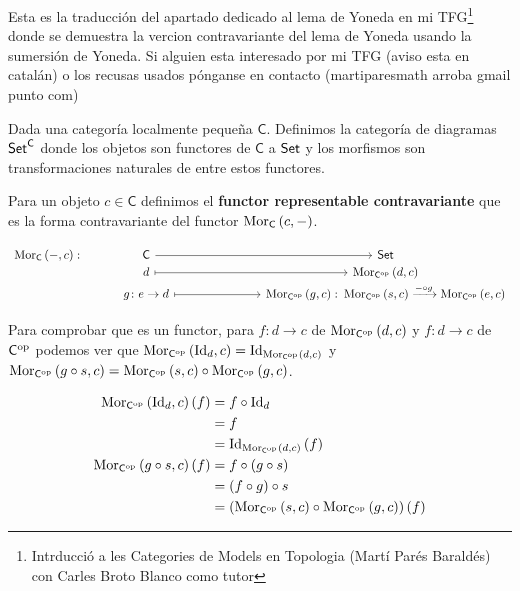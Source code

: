 Esta es la traducción del apartado dedicado al lema de Yoneda en mi TFG\footnote{Intrducció a les Categories de Models en Topologia (Martí Parés Baraldés) con Carles Broto Blanco como tutor} donde se demuestra la vercion contravariante del lema de Yoneda usando la sumersión de Yoneda. Si alguien esta interesado por mi TFG (aviso esta en catalán) o los recusas usados pónganse en contacto (martiparesmath arroba gmail punto com)

\begin{definition}\label{def:diagCat}
  Dada una categoría localmente pequeña $\mathsf{C}$. Definimos la categoría de diagramas $\textup{\textsf{Set}}^{\mathsf{C}}$ donde los objetos son functores de $\mathsf{C}$ a $\textup{\textsf{Set}}$ y los morfismos son transformaciones naturales de entre estos functores.
\end{definition}


\begin{definition}\label{def:Mor(-,c)}
  Para un objeto $c \in \mathsf{C}$ definimos el {\bf functor representable contravariante} que es la forma contravariante del functor $\operatorname{\mathrm{Mor}}_{\mathsf{C}}\left(c,-\right)$.

  \begin{equation*}
    \begin{tikzcd}[row sep = -0.1 cm]
    \Mor{\mathsf{C}}{-,c} \colon & \mathsf{C} \arrow[rrr] & & & \Set  \\
    & d \arrow[rrr,mapsto] & & & \Mor{\mathsf{C}^{\op}}{d,c} \\
    & g\colon e \rightarrow d \arrow[rrr,mapsto] & & & \Mor{\mathsf{C}^{\op}}{g,c}\colon \Mor{\mathsf{C}^\op}{s,c} \xrightarrow{-\circ g} \Mor{\mathsf{C}^\op}{e,c}
  \end{tikzcd}
  \end{equation*}

  Para comprobar que es un functor, para $f\colon d \rightarrow c$ de $\operatorname{\mathrm{Mor}}_{\mathsf{C}^{\mathrm{op}}}\left(d,c\right)$ y $f\colon d \rightarrow c$ de $\mathsf{C}^{\mathrm{op}}$ podemos ver que $\operatorname{\mathrm{Mor}}_{\mathsf{C}^{\mathrm{op}}}\left(\mathrm{Id}_{d},c\right)=\mathrm{Id}_{\operatorname{\mathrm{Mor}}_{\mathsf{C}^{\mathrm{op}}}\left(d,c\right)}$ y $\operatorname{\mathrm{Mor}}_{\mathsf{C}^{\mathrm{op}}}\left(g \circ s,c\right)=\operatorname{\mathrm{Mor}}_{\mathsf{C}^{\mathrm{op}}}\left(s,c\right) \circ \operatorname{\mathrm{Mor}}_{\mathsf{C}^{\mathrm{op}}}\left(g,c\right)$.


\begin{align*}
  \operatorname{\mathrm{Mor}}_{\mathsf{C}^{\mathrm{op}}}\left(\mathrm{Id}_{d},c\right)\left(f\right)  &= f\circ \mathrm{Id}_{d} \\ 
  &= f \\ 
  &= \mathrm{Id}_{\operatorname{\mathrm{Mor}}_{\mathsf{C}^{\mathrm{op}}}\left(d,c\right)}\left(f\right) \\ 
  \operatorname{\mathrm{Mor}}_{\mathsf{C}^{\mathrm{op}}}\left(g\circ s, c\right)\left(f\right)  &= f\circ \left(g\circ s\right) \\ 
    &= \left(f\circ g\right)\circ s \\ 
  &=  \left(\operatorname{\mathrm{Mor}}_{\mathsf{C}^{\mathrm{op}}}\left(s,c\right)\circ \operatorname{\mathrm{Mor}}_{\mathsf{C}^{\mathrm{op}}}\left(g,c\right)\right)\left(f\right)
\end{align*}

\end{definition}


